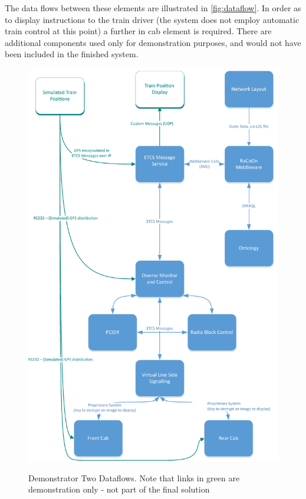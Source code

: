The data flows between these elements are illustrated in \autoref{fig:dataflow}. In order as to display instructions to the train driver (the system does not employ automatic train control at this point) a further in cab element is required. There are additional components used only for demonstration purposes, and would not have been included in the finished system.

\begin{figure}[H]
\myfloatalign
{\includegraphics[max height=\textheight,max width=\linewidth]{gfx/Dataflow-StirDemoActive}} 
\caption{Demonstrator Two Dataflows. Note that links in green are demonstration only - not part of the final solution}
\label{fig:dataflow}
\end{figure}

